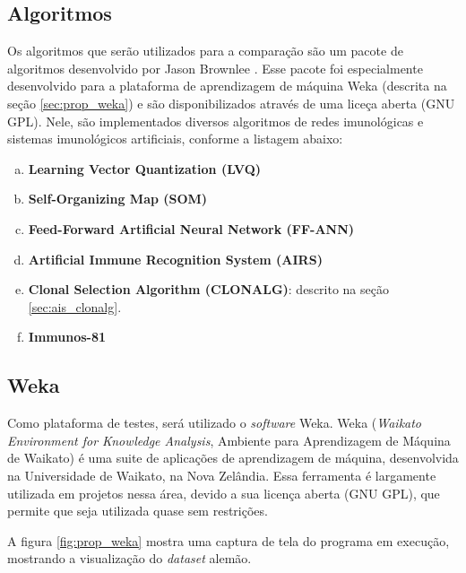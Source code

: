 \subsection{Algoritmos}

Os algoritmos que serão utilizados para a comparação são um pacote de algoritmos desenvolvido por Jason Brownlee \cite{Brownlee2007}. Esse pacote foi especialmente desenvolvido para a plataforma de aprendizagem de máquina Weka (descrita na seção \ref{sec:prop_weka}) e são disponibilizados através de uma liceça aberta (GNU GPL). Nele, são implementados diversos algoritmos de redes imunológicas e sistemas imunológicos artificiais, conforme a listagem abaixo:

\begin{enumerate}[a)]
    \item \textbf{Learning Vector Quantization (LVQ)}
    \item \textbf{Self-Organizing Map (SOM)}
    \item \textbf{Feed-Forward Artificial Neural Network (FF-ANN)} 
    \item \textbf{Artificial Immune Recognition System (AIRS)}
    \item \textbf{Clonal Selection Algorithm (CLONALG)}: descrito na seção \ref{sec:ais_clonalg}.
    \item \textbf{Immunos-81}
\end{enumerate}

\subsection{Weka}{}
\label{sec:prop_weka}

Como plataforma de testes, será utilizado o \emph{software} Weka. Weka (\emph{Waikato Environment for Knowledge Analysis}, Ambiente para Aprendizagem de Máquina de Waikato) é uma suite de aplicações de aprendizagem de máquina, desenvolvida na Universidade de Waikato, na Nova Zelândia. Essa ferramenta é largamente utilizada em projetos nessa área, devido a sua licença aberta (GNU GPL), que permite que seja utilizada quase sem restrições.

A figura \ref{fig:prop_weka} mostra uma captura de tela do programa em execução, mostrando a visualização do \emph{dataset} alemão.

